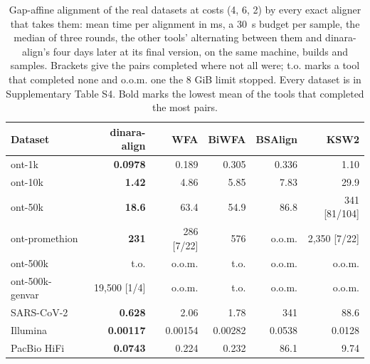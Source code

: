 \begin{table}[t]
\caption{Gap-affine alignment of the real datasets at costs (4, 6, 2) by every exact aligner that takes them: mean time per alignment in ms, a 30~s budget per sample, the median of three rounds, the other tools' alternating between them and dinara-align's four days later at its final version, on the same machine, builds and samples. Brackets give the pairs completed where not all were; t.o. marks a tool that completed none and o.o.m. one the 8 GiB limit stopped. Every dataset is in Supplementary Table S4. Bold marks the lowest mean of the tools that completed the most pairs.}\label{tab:affine}
\centering\footnotesize
\setlength{\tabcolsep}{4pt}
\begin{tabular}{@{}lrrrrr@{}}
\toprule
Dataset & dinara-align & WFA & BiWFA & BSAlign & KSW2 \\
\midrule
ont-1k & \textbf{0.0978} & 0.189 & 0.305 & 0.336 & 1.10 \\
ont-10k & \textbf{1.42} & 4.86 & 5.85 & 7.83 & 29.9 \\
ont-50k & \textbf{18.6} & 63.4 & 54.9 & 86.8 & 341 [81/104] \\
ont-promethion & \textbf{231} & 286 [7/22] & 576 & o.o.m. & 2{,}350 [7/22] \\
ont-500k & t.o. & o.o.m. & t.o. & o.o.m. & o.o.m. \\
ont-500k-genvar & 19{,}500 [1/4] & o.o.m. & t.o. & o.o.m. & o.o.m. \\
SARS-CoV-2 & \textbf{0.628} & 2.06 & 1.78 & 341 & 88.6 \\
Illumina & \textbf{0.00117} & 0.00154 & 0.00282 & 0.0538 & 0.0128 \\
PacBio HiFi & \textbf{0.0743} & 0.224 & 0.232 & 86.1 & 9.74 \\
\bottomrule
\end{tabular}
\end{table}
